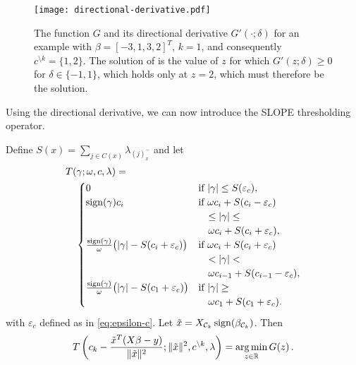 \begin{figure}[htb]
  \centering
  \texttt{[image: directional-derivative.pdf]}
  \caption{%
  The function \(G\) and its directional derivative \(G'( \cdot ; \delta)\) for
  an example with \(\beta = [-3, 1, 3, 2]^T\), \(k = 1\), and consequently
  \(c^{\setminus k} = \{1, 2\}\). The solution of  is the value of \(z\) for
      which \(G'(z; \delta) \geq 0 \) for \(\delta \in \{-1, 1\}\), which holds only
      at \(z = 2\), which must therefore be the solution.
    }
  \label{fig:directional-derivative}
\end{figure}

Using the directional derivative, we can now introduce the SLOPE thresholding operator.

\begin{theorem}
  \label{thm:thresholding-operator}
  Define \(S(x) = \sum_{j \in C(x)}\lambda_{(j)^-_{x}}\) and
  let
  \[
    \begin{multlined}
      T(\gamma; \omega, c, \lambda) = \\
      \begin{cases}
        0
            & \text{if } |\gamma| \leq S(\varepsilon_c),               \\
        \sign(\gamma)c_i
            & \text{if } \omega c_i + S(c_i - \varepsilon_c)           \\
            & \quad \leq |\gamma| \leq                                 \\
            & \quad \omega c_i + S(c_i + \varepsilon_c),               \\
        \frac{\sign(\gamma)}{\omega} \big( |\gamma| - S(c_i + \varepsilon_c) \big)
            & \text{if } \omega c_i + S(c_i + {\varepsilon_c})         \\
            & \quad < |\gamma| <                                       \\
            & \quad \omega c_{i - 1} + S(c_{i - 1} - {\varepsilon_c}), \\
        \frac{\sign(\gamma)}{\omega} \big( |\gamma| - S(c_1 + {\varepsilon_c}) \big)
            & \text{if } |\gamma| \geq                                 \\
            & \quad \omega c_1 + S(c_1 + {\varepsilon_c}).
      \end{cases}
    \end{multlined}
  \]
  with \({\varepsilon_c}\) defined as in \eqref{eq:epsilon-c}.
  Let $\tilde x = X_{\mathcal{C}_k} \operatorname{sign}(\beta_{\mathcal{C}_k})$.
  Then
  \begin{equation}
    \begin{multlined}
      T \left(c_k - \frac{\tilde x^T(X\beta - y)}{\norm{\tilde x}^2} ; \Vert \tilde x \Vert^2, c^{\setminus k}, \lambda \right) = \argmin_{z \in \mathbb{R}} G(z) \,.
    \end{multlined}
  \end{equation}
\end{theorem}

